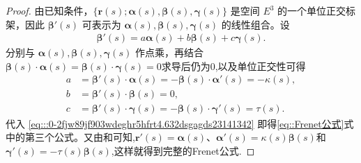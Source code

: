 \documentclass[../../main.tex]{subfiles}%
\begin{document}
\begin{proof}

由已知条件，$\{\bm{r}(s); \bm{\alpha}(s), \bm{\beta}(s), \bm{\gamma}(s)\}$ 是空间 $E^3$ 的一个单位正交标架，因此 $\bm{\beta}'(s)$ 可表示为 $\bm{\alpha}(s), \bm{\beta}(s), \bm{\gamma}(s)$ 的线性组合。设
\begin{align}
\bm{\beta}'(s) = a \bm{\alpha}(s) + b \bm{\beta}(s) + c \bm{\gamma}(s). \label{eq:::0-2fjw89jf903wdeghr5hfrt4.632dsgagds23141342}
\end{align}
分别与 $\bm{\alpha}(s), \bm{\beta}(s), \bm{\gamma}(s)$ 作点乘，再结合$\bm{\beta}(s)\cdot\bm{\alpha}(s)=\bm{\beta}(s)\cdot \bm{\gamma}(s)=0$求导后仍为0,以及单位正交性可得
\begin{align*}
a &= \bm{\beta}'(s)\cdot\bm{\alpha}(s) = -\bm{\beta}(s)\cdot\bm{\alpha}'(s) = -\kappa(s), \\
b &= \bm{\beta}'(s)\cdot\bm{\beta}(s) = 0, \\
c &= \bm{\beta}'(s)\cdot\bm{\gamma}(s) = -\bm{\beta}(s)\cdot\bm{\gamma}'(s) = \tau(s).
\end{align*}
代入 \eqref{eq:::0-2fjw89jf903wdeghr5hfrt4.632dsgagds23141342} 即得\eqref{eq::Frenet公式}式中的第三个公式。又由和可知,$\bm{r}'(s)=\bm{\alpha}(s)$、$\bm{\alpha}'(s)=\kappa(s)\bm{\beta}(s)$和$\bm{\gamma}'(s)=-\tau(s)\bm{\beta}(s)$,这样就得到完整的Frenet公式.
\end{proof}
\end{document}
